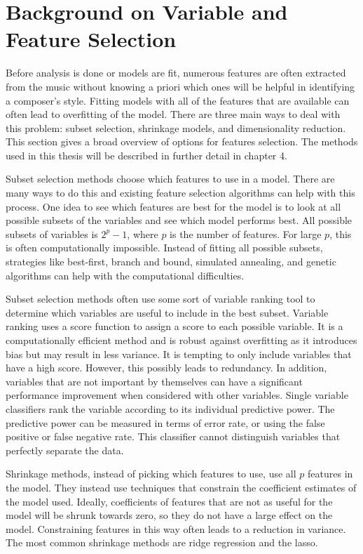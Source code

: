 \documentclass[12pt,twoside]{reedthesis}
\theoremstyle{definition}
\theoremstyle{definition}
\theoremstyle{definition}
\theoremstyle{remark}
\begin{document}
\section{Background on Variable and Feature
Selection}\label{background-on-variable-and-feature-selection}

Before analysis is done or models are fit, numerous features are often
extracted from the music without knowing a priori which ones will be
helpful in identifying a composer's style. Fitting models with all of
the features that are available can often lead to overfitting of the
model. There are three main ways to deal with this problem: subset
selection, shrinkage models, and dimensionality reduction. This section
gives a broad overview of options for features selection. The methods
used in this thesis will be described in further detail in chapter 4.

Subset selection methods choose which features to use in a model. There
are many ways to do this and existing feature selection algorithms can
help with this process. One idea to see which features are best for the
model is to look at all possible subsets of the variables and see which
model performs best. All possible subsets of variables is \(2^p-1\),
where \(p\) is the number of features. For large \(p\), this is often
computationally impossible. Instead of fitting all possible subsets,
strategies like best-first, branch and bound, simulated annealing, and
genetic algorithms can help with the computational difficulties.

Subset selection methods often use some sort of variable ranking tool to
determine which variables are useful to include in the best subset.
Variable ranking uses a score function to assign a score to each
possible variable. It is a computationally efficient method and is
robust against overfitting as it introduces bias but may result in less
variance. It is tempting to only include variables that have a high
score. However, this possibly leads to redundancy. In addition,
variables that are not important by themselves can have a significant
performance improvement when considered with other variables. Single
variable classifiers rank the variable according to its individual
predictive power. The predictive power can be measured in terms of error
rate, or using the false positive or false negative rate. This
classifier cannot distinguish variables that perfectly separate the
data.

Shrinkage methods, instead of picking which features to use, use all
\(p\) features in the model. They instead use techniques that constrain
the coefficient estimates of the model used. Ideally, coefficients of
features that are not as useful for the model will be shrunk towards
zero, so they do not have a large effect on the model. Constraining
features in this way often leads to a reduction in variance. The most
common shrinkage methods are ridge regression and the lasso.
\end{document}
